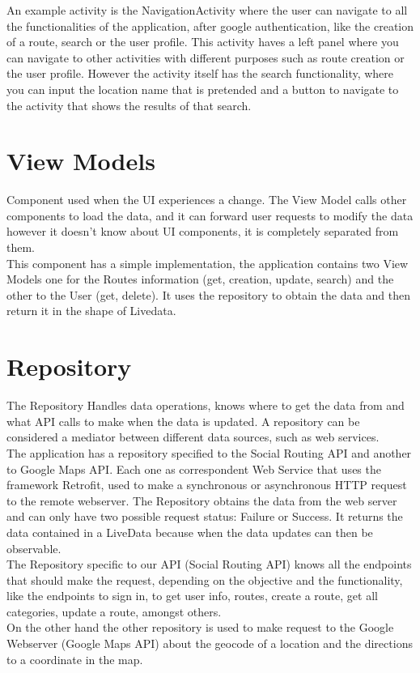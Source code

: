 An example activity is the NavigationActivity where the user can navigate to all the functionalities of the application, after google authentication, like the creation of a route, 
search or the user profile. This activity haves a left panel where you can navigate to other activities with different purposes such as route creation or the user profile. 
However the activity itself has the search functionality, where you can input the location name that is pretended and a button to navigate to the activity that shows the 
results of that search.

\section*{View Models}
Component used when the UI experiences a change. The View Model calls
other components to load the data, and it can forward user requests to
modify the data however it doesn't know about UI components, 
it is completely separated from them. \\
This component has a simple implementation, the application contains two View Models one for the Routes information (get, creation, update, search) and the other 
to the User (get, delete). It uses the repository to obtain the data and then return it in the shape of Livedata\cite{livedata}.

\section*{Repository}
The Repository Handles data operations, knows where to get the data from
and what API calls to make when the data is updated. A repository can be
considered a mediator between different data sources, such as web services. \\
The application has a repository specified to the Social Routing API and another to Google Maps API\cite{googlemaps}. Each one as correspondent Web Service that uses the
framework Retrofit\cite{retrofit}, used to make a synchronous or asynchronous HTTP request to the remote webserver. The Repository obtains the data
from the web server and can only have two possible request status: Failure or Success. It returns the data contained in a LiveData because when the data 
updates can then be observable. \\
The Repository specific to our API (Social Routing API) knows all the endpoints that should make the request, depending on the objective and the functionality, like 
the endpoints to sign in, to get user info, routes, create a route, get all categories, update a route, amongst others. \\
On the other hand the other repository is used to make request to the Google Webserver (Google Maps API) about the geocode of a location and the directions to a coordinate in the map. 


